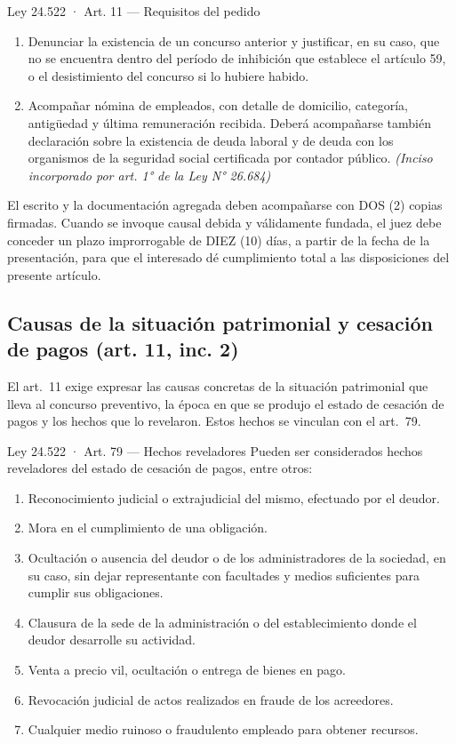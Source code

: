 \documentclass[12pt,oneside]{book}
\begin{document}
\begin{norma}{Ley 24.522 · Art. 11 — Requisitos del pedido}
\begin{enumerate}[label=\arabic*),leftmargin=*]
    \item Denunciar la existencia de un concurso anterior y justificar, en su caso, que no se encuentra dentro del período de inhibición que establece el artículo 59, o el desistimiento del concurso si lo hubiere habido.
    \item Acompañar nómina de empleados, con detalle de domicilio, categoría, antigüedad y última remuneración recibida. Deberá acompañarse también declaración sobre la existencia de deuda laboral y de deuda con los organismos de la seguridad social certificada por contador público. \textit{(Inciso incorporado por art. 1° de la Ley N° 26.684)}
\end{enumerate}
El escrito y la documentación agregada deben acompañarse con DOS (2) copias firmadas. Cuando se invoque causal debida y válidamente fundada, el juez debe conceder un plazo improrrogable de DIEZ (10) días, a partir de la fecha de la presentación, para que el interesado dé cumplimiento total a las disposiciones del presente artículo.
\end{norma}

\subsection{Causas de la situación patrimonial y cesación de pagos (art. 11, inc. 2)}

El art.~11 exige expresar las causas concretas de la situación patrimonial que lleva al concurso preventivo, la época en que se produjo el estado de cesación de pagos y los hechos que lo revelaron. Estos hechos se vinculan con el art.~79.

\begin{norma}{Ley 24.522 · Art. 79 — Hechos reveladores}
Pueden ser considerados hechos reveladores del estado de cesación de pagos, entre otros:
\begin{enumerate}[label=\arabic*),leftmargin=*]
    \item Reconocimiento judicial o extrajudicial del mismo, efectuado por el deudor.
    \item Mora en el cumplimiento de una obligación.
    \item Ocultación o ausencia del deudor o de los administradores de la sociedad, en su caso, sin dejar representante con facultades y medios suficientes para cumplir sus obligaciones.
    \item Clausura de la sede de la administración o del establecimiento donde el deudor desarrolle su actividad.
    \item Venta a precio vil, ocultación o entrega de bienes en pago.
    \item Revocación judicial de actos realizados en fraude de los acreedores.
    \item Cualquier medio ruinoso o fraudulento empleado para obtener recursos.
\end{enumerate}
\end{norma}
\end{document}
